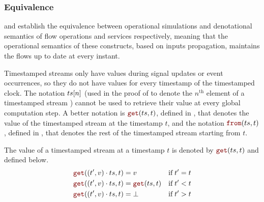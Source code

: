 \subsubsection{Equivalence}
\label{sec:semantics:grfrp:theorems:equivalence}

 and 
establish the equivalence between operational simulations and denotational semantics of flow
operations and services respectively, meaning that the operational semantics of these constructs,
based on inputs propagation, maintains the flows up to date at every instant.

\newcommand{\getAt}[2]{\ensuremath{\smf{get}(#1, #2)}}
\newcommand{\from}[2]{\ensuremath{\smf{from}(#1, #2)}}

Timestamped streams only have values during signal updates or event occurrences, so they do not have
values for every timestamp of the timestamped clock. The notation $ts[n]$ (used in the proof of
 to denote the $n^\text{th}$ element of a timestamped
stream \ts) cannot be used to retrieve their value at every global computation step.
A better notation is \getAt{\ts}{t}, defined in , that
denotes the value of the timestamped stream \ts at the timestamp $t$, and the notation \from{\ts}{t},
defined in , that denotes the rest of the timestamped
stream starting from $t$.

\begin{definition}
    \label{def:semantics:grfrp:theorems:equivalence:getat}
    The value of a timestamped stream \ts at a timestamp $t$ is denoted by \getAt{\ts}{t} and defined
    below.
    \begin{align}
        \getAt{(t', v) \next \ts}{t} & = v              & \text{if} \; t' & = t \\
        \getAt{(t', v) \next \ts}{t} & = \getAt{\ts}{t} & \text{if} \; t' & < t \\
        \getAt{(t', v) \next \ts}{t} & = \bot           & \text{if} \; t' & > t
    \end{align}
\end{definition}

